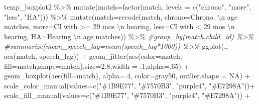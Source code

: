 \documentclass[
]{article}
\newenvironment{Shaded}{\begin{snugshade}}{\end{snugshade}}
\newcommand{\AttributeTok}[1]{\textcolor[rgb]{0.77,0.63,0.00}{#1}}
\newcommand{\CommentTok}[1]{\textcolor[rgb]{0.56,0.35,0.01}{\textit{#1}}}
\newcommand{\ConstantTok}[1]{\textcolor[rgb]{0.00,0.00,0.00}{#1}}
\newcommand{\DecValTok}[1]{\textcolor[rgb]{0.00,0.00,0.81}{#1}}
\newcommand{\FloatTok}[1]{\textcolor[rgb]{0.00,0.00,0.81}{#1}}
\newcommand{\FunctionTok}[1]{\textcolor[rgb]{0.00,0.00,0.00}{#1}}
\newcommand{\NormalTok}[1]{#1}
\newcommand{\SpecialCharTok}[1]{\textcolor[rgb]{0.00,0.00,0.00}{#1}}
\newcommand{\StringTok}[1]{\textcolor[rgb]{0.31,0.60,0.02}{#1}}
\begin{document}
\begin{Shaded}
\begin{Highlighting}[]
\NormalTok{temp\_boxplot2 }\SpecialCharTok{\%\textgreater{}\%}
  \FunctionTok{mutate}\NormalTok{(}\AttributeTok{match=}\FunctionTok{factor}\NormalTok{(match, }\AttributeTok{levels =} \FunctionTok{c}\NormalTok{(}\StringTok{"chrono"}\NormalTok{, }\StringTok{"more"}\NormalTok{, }\StringTok{"less"}\NormalTok{, }\StringTok{"HA"}\NormalTok{))) }\SpecialCharTok{\%\textgreater{}\%}
   \FunctionTok{mutate}\NormalTok{(}\AttributeTok{match=}\FunctionTok{recode}\NormalTok{(match,}
                      \AttributeTok{chrono=}\StringTok{\textquotesingle{}Chrono. }\SpecialCharTok{\textbackslash{}n}\StringTok{ age matches\textquotesingle{}}\NormalTok{,}
                      \AttributeTok{more=}\StringTok{\textquotesingle{}CI with \textgreater{}= 29 mos }\SpecialCharTok{\textbackslash{}n}\StringTok{ hearing\textquotesingle{}}\NormalTok{,}
                      \AttributeTok{less=}\StringTok{\textquotesingle{}CI with \textless{} 29 mos }\SpecialCharTok{\textbackslash{}n}\StringTok{ hearing\textquotesingle{}}\NormalTok{,}
                      \AttributeTok{HA=}\StringTok{\textquotesingle{}Hearing }\SpecialCharTok{\textbackslash{}n}\StringTok{ age matches\textquotesingle{}}\NormalTok{)) }\SpecialCharTok{\%\textgreater{}\%}
   \CommentTok{\#group\_by(match,child\_id) \%\textgreater{}\%}
   \CommentTok{\#summarize(mean\_speech\_lag=mean(speech\_lag*1000)) \%\textgreater{}\%}
\FunctionTok{ggplot}\NormalTok{(., }\FunctionTok{aes}\NormalTok{(match, speech\_lag)) }\SpecialCharTok{+}
  \FunctionTok{geom\_jitter}\NormalTok{(}\FunctionTok{aes}\NormalTok{(}\AttributeTok{color=}\NormalTok{match, }\AttributeTok{fill=}\NormalTok{match,}\AttributeTok{shape=}\NormalTok{match),}\AttributeTok{size=}\FloatTok{2.8}\NormalTok{,}\AttributeTok{width =}\NormalTok{ .}\DecValTok{1}\NormalTok{,}\AttributeTok{alpha=}\NormalTok{.}\DecValTok{65}\NormalTok{) }\SpecialCharTok{+}
  \FunctionTok{geom\_boxplot}\NormalTok{(}\FunctionTok{aes}\NormalTok{(}\AttributeTok{fill=}\NormalTok{match), }\AttributeTok{alpha=}\NormalTok{.}\DecValTok{4}\NormalTok{, }\AttributeTok{color=}\StringTok{\textquotesingle{}gray50\textquotesingle{}}\NormalTok{, }\AttributeTok{outlier.shape =} \ConstantTok{NA}\NormalTok{) }\SpecialCharTok{+}
  \FunctionTok{scale\_color\_manual}\NormalTok{(}\AttributeTok{values=}\FunctionTok{c}\NormalTok{(}\StringTok{"\#1B9E77"}\NormalTok{, }\StringTok{"\#7570B3"}\NormalTok{, }\StringTok{"purple4"}\NormalTok{, }\StringTok{"\#E7298A"}\NormalTok{))}\SpecialCharTok{+}
  \FunctionTok{scale\_fill\_manual}\NormalTok{(}\AttributeTok{values=}\FunctionTok{c}\NormalTok{(}\StringTok{"\#1B9E77"}\NormalTok{, }\StringTok{"\#7570B3"}\NormalTok{, }\StringTok{"purple4"}\NormalTok{, }\StringTok{"\#E7298A"}\NormalTok{)) }\SpecialCharTok{+}

\end{Highlighting}
\end{Shaded}
\end{document}
